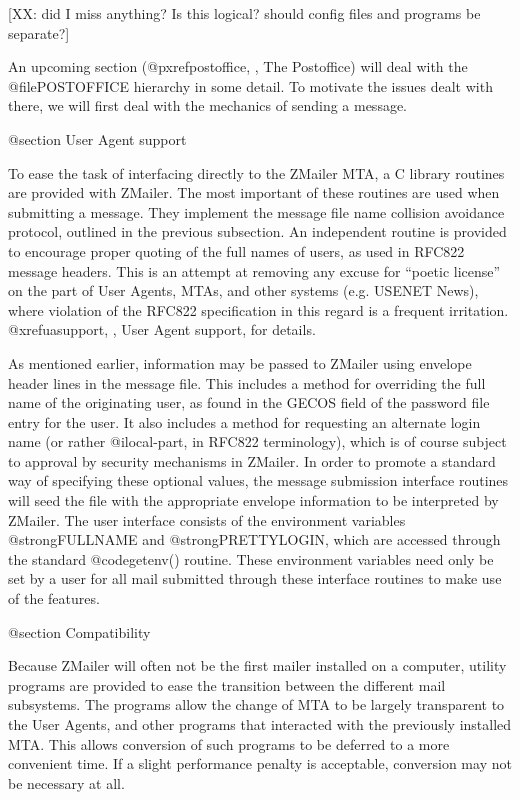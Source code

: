 [XX: did I miss anything? Is this logical? should config files
     and programs be separate?]

An upcoming section (@pxref{postoffice, , The Postoffice}) will
deal with the @file{POSTOFFICE} hierarchy in some detail.
To motivate the issues dealt with there, we will first deal with
the mechanics of sending a message.

@section User Agent support

To ease the task of interfacing directly to the ZMailer MTA,
a C library routines are provided with ZMailer.
The most important of these routines are used when submitting a message.
They implement the message file name collision avoidance protocol,
outlined in the previous subsection.
An independent routine is provided to encourage proper quoting
of the full names of users, as used in RFC822 message headers.
This is an attempt at removing any excuse for ``poetic license''
on the part of User Agents, MTAs, and other systems (e.g. USENET News),
where violation of the RFC822 specification in this regard is
a frequent irritation.  @xref{uasupport, , User Agent support}, for
details.

As mentioned earlier, information may be passed to ZMailer using
envelope header lines in the message file.
This includes a method for overriding the full name of the originating
user, as found in the GECOS field of the password file entry for the user.
It also includes a method for requesting an alternate login name
(or rather @i{local-part}, in RFC822 terminology), which is of course
subject to approval by security mechanisms in ZMailer.
In order to promote a standard way of specifying these optional values,
the message submission interface routines will seed the file with
the appropriate envelope information to be interpreted by ZMailer.
The user interface consists of the environment variables
@strong{FULLNAME} and @strong{PRETTYLOGIN}, which are accessed through
the standard @code{getenv()} routine.
These environment variables need only be set by a user for all mail
submitted through these interface routines to make use of the features.

@section Compatibility

Because ZMailer will often not be the first mailer installed on
a computer, utility programs are provided to ease the transition
between the different mail subsystems.
The programs allow the change of MTA to be largely transparent
to the User Agents, and other programs that interacted with
the previously installed MTA.
This allows conversion of such programs to be deferred to a more
convenient time.
If a slight performance penalty is acceptable, conversion may not
be necessary at all.


